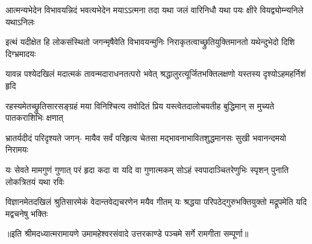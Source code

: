 \fourlineindentedshloka
{आत्मन्यभेदेन विभावयन्निदं}
{भवत्यभेदेन मयाऽऽत्मना तदा}
{यथा जलं वारिनिधौ यथा पयः}
{क्षीरे वियद्व्योम्न्यनिले यथाऽनिलः} %

\fourlineindentedshloka
{इत्थं यदीक्षेत हि लोकसंस्थितो}
{जगन्मृषैवेति विभावयन्मुनिः}
{निराकृतत्वाच्छ्रुतियुक्तिमानतो}
{यथेन्दुभेदो दिशि दिग्भ्रमादयः} %

\fourlineindentedshloka
{यावन्न पश्येदखिलं मदात्मकं}
{तावन्मदाराधनतत्परो भवेत्}
{श्रद्धालुरत्यूर्जितभक्तिलक्षणो}
{यस्तस्य दृश्योऽहमहर्निशं हृदि} %

\fourlineindentedshloka
{रहस्यमेतच्छ्रुतिसारसङ्ग्रहं}
{मया विनिश्चित्य तवोदितं प्रिय}
{यस्त्वेतदालोचयतीह बुद्धिमान्}
{स मुच्यते पातकराशिभिः क्षणात्} %

\fourlineindentedshloka
{भ्रातर्यदीदं परिदृश्यते जगन्-}
{मायैव सर्वं परिहृत्य चेतसा}
{मद्भावनाभावितशुद्धमानसः}
{सुखी भवानन्दमयो निरामयः} %

\fourlineindentedshloka
{यः सेवते मामगुणं गुणात् परं}
{हृदा कदा वा यदि वा गुणात्मकम्}
{सोऽहं स्वपादाञ्चितरेणुभिः स्पृशन्}
{पुनाति लोकत्रितयं यथा रविः} %

\fourlineindentedshloka
{विज्ञानमेतदखिलं श्रुतिसारमेकं}
{वेदान्तवेद्यचरणेन मयैव गीतम्}
{यः श्रद्धया परिपठेद्गुरुभक्तियुक्तो}
{मद्रूपमेति यदि मद्वचनेषु भक्तिः} %

{॥इति श्रीमदध्यात्मरामायणे उमामहेश्वरसंवादे उत्तरकाण्डे पञ्चमे  सर्गे
रामगीता सम्पूर्णा॥}
